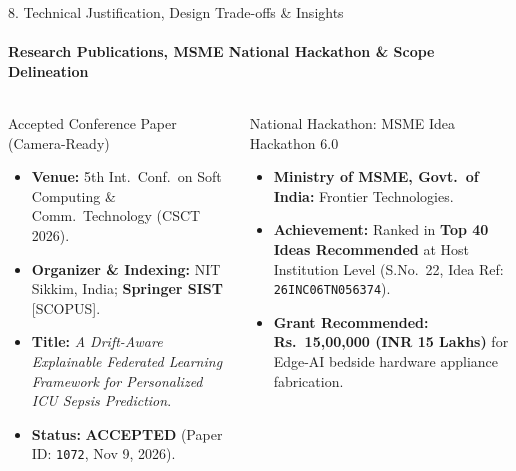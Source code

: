 \documentclass[aspectratio=169, 11pt]{beamer}
\begin{document}
\begin{frame}{8. Technical Justification, Design Trade-offs \& Insights}
    \framesubtitle{Research Publications, MSME National Hackathon \& Scope Delineation}
    \begin{columns}[T]
        \begin{block}{Accepted Conference Paper (Camera-Ready)}
            \scriptsize
            \begin{itemize}
                \item \textbf{Venue:} 5th Int.\ Conf.\ on Soft Computing \& Comm.\ Technology (CSCT 2026).
                \item \textbf{Organizer \& Indexing:} NIT Sikkim, India; \textbf{Springer SIST} [SCOPUS].
                \item \textbf{Title:} \textit{A Drift-Aware Explainable Federated Learning Framework for Personalized ICU Sepsis Prediction}.
                \item \textbf{Status:} \textbf{ACCEPTED} (Paper ID: \texttt{1072}, Nov 9, 2026).
            \end{itemize}
        \end{block}
        \vspace{-0.15cm}

        \begin{block}{National Hackathon: MSME Idea Hackathon 6.0}
            \scriptsize
            \begin{itemize}
                \item \textbf{Ministry of MSME, Govt.\ of India:} Frontier Technologies.
                \item \textbf{Achievement:} Ranked in \textbf{Top 40 Ideas Recommended} at Host Institution Level (S.No.~22, Idea Ref: \texttt{26INC06TN056374}).
                \item \textbf{Grant Recommended:} \textbf{Rs.~15,00,000 (INR 15 Lakhs)} for Edge-AI bedside hardware appliance fabrication.
            \end{itemize}
        \end{block}


\end{columns}
\end{frame}
\end{document}
